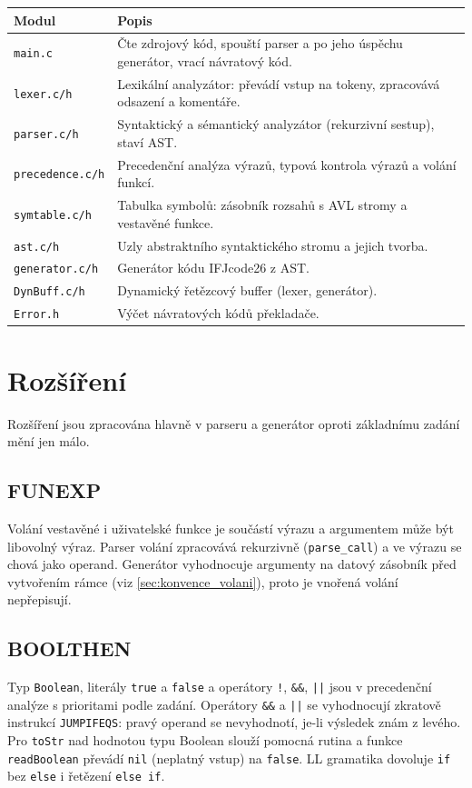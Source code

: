 \documentclass[11pt]{article}
\newif\ifdraft
\newcommand{\todo}[1]{\ifdraft{\color{red}\textbf{[TODO: #1]}}\fi}
\newcommand{\file}[1]{\texttt{#1}}                   %
\newcommand{\ic}[1]{\texttt{#1}}                     %
\begin{document}
\begin{tabularx}{\linewidth}{@{}lX@{}}
  \toprule
  Modul & Popis \\
  \midrule
  \file{main.c} & Čte zdrojový kód, spouští parser a po jeho úspěchu generátor, vrací návratový kód. \\
  \file{lexer.c/h} & Lexikální analyzátor: převádí vstup na tokeny, zpracovává odsazení a komentáře. \\
  \file{parser.c/h} & Syntaktický a sémantický analyzátor (rekurzivní sestup), staví AST. \\
  \file{precedence.c/h} & Precedenční analýza výrazů, typová kontrola výrazů a volání funkcí. \\
  \file{symtable.c/h} & Tabulka symbolů: zásobník rozsahů s AVL stromy a vestavěné funkce. \\
  \file{ast.c/h} & Uzly abstraktního syntaktického stromu a jejich tvorba. \\
  \file{generator.c/h} & Generátor kódu IFJcode26 z AST. \\
  \file{DynBuff.c/h} & Dynamický řetězcový buffer (lexer, generátor). \\
  \file{Error.h} & Výčet návratových kódů překladače. \\
  \bottomrule
\end{tabularx}

\section{Rozšíření}
Rozšíření jsou zpracována hlavně v parseru a generátor oproti základnímu zadání mění jen málo. \todo{u každého rozšíření upravit popis podle skutečné implementace}

\subsection{FUNEXP}
Volání vestavěné i uživatelské funkce je součástí výrazu a argumentem může být libovolný výraz. Parser volání zpracovává rekurzivně (\texttt{parse\_call}) a ve výrazu se chová jako operand. Generátor vyhodnocuje argumenty na datový zásobník před vytvořením rámce (viz \ref{sec:konvence_volani}), proto je vnořená volání nepřepisují.

\subsection{BOOLTHEN}
Typ \texttt{Boolean}, literály \texttt{true} a \texttt{false} a operátory \texttt{!}, \texttt{\&\&}, \texttt{||} jsou v precedenční analýze s prioritami podle zadání. Operátory \texttt{\&\&} a \texttt{||} se vyhodnocují zkratově instrukcí \ic{JUMPIFEQS}: pravý operand se nevyhodnotí, je-li výsledek znám z levého. Pro \texttt{toStr} nad hodnotou typu Boolean slouží pomocná rutina a funkce \texttt{readBoolean} převádí \ic{nil} (neplatný vstup) na \texttt{false}. LL gramatika dovoluje \texttt{if} bez \texttt{else} i řetězení \texttt{else if}.
\end{document}
